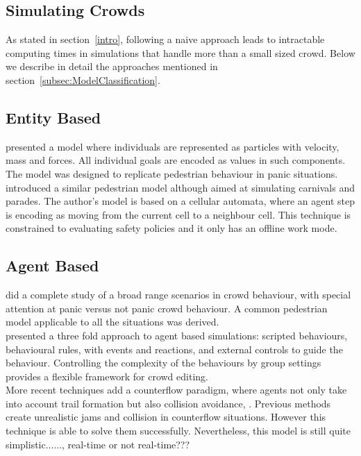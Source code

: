 \documentclass[6pt]{article} %
\begin{document}
\begin{multicols}{2}
\section{Simulating Crowds}

As stated in section~\ref{intro}, following a naive approach leads to intractable computing times in simulations that handle more than a small sized crowd.
Below we describe in detail the approaches mentioned in section~\ref{subsec:ModelClassification}. 

\subsection{Entity Based}

\cite{Helbing2000} presented a model where individuals are represented as particles with velocity, mass and forces.
All individual goals are encoded as values in such components.
The model was designed to replicate pedestrian behaviour in panic situations.\\

\cite{batty2003} introduced a similar pedestrian model although aimed at simulating carnivals and parades.
The author's model is based on a cellular automata, where an agent step is encoding as moving from the current cell to a neighbour cell.
This technique is constrained to evaluating safety policies and it only has an offline work mode.

\subsection{Agent Based}

\cite{helbing2002} did a complete study of a broad range scenarios in crowd behaviour, with special attention at panic versus not panic crowd behaviour.
A common pedestrian model applicable to all the situations was derived.\\

\cite{raupp2001} presented a three fold approach to agent based simulations: scripted behaviours, behavioural rules, with events and reactions, and external controls to guide the behaviour.
Controlling the complexity of the behaviours by group settings provides a flexible framework for crowd editing.\\

More recent techniques add a counterflow paradigm, where agents not only take into account trail formation but also collision avoidance, \cite{heliovaara2012}.
Previous methods create unrealistic jams and collision in counterflow situations.
However this technique is able to solve them successfully.
Nevertheless, this model is still quite simplistic......, real-time or not real-time???


\end{multicols}
\end{document}
